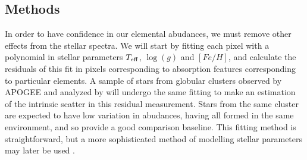 \documentclass[preprint]{aastex}
\begin{document}
\subsection{Methods}
\label{sec:methods}

In order to have confidence in our elemental abudances, we must remove other effects from the stellar spectra. We will start by fitting each pixel with a polynomial in stellar parameters $T_{\rm eff}$, $\log(g)$ and $[Fe/H]$, and calculate the residuals of this fit in pixels corresponding to absorption features corresponding to particular elements. A sample of stars from globular clusters observed by APOGEE and analyzed by \citet{meszaros2015} will undergo the same fitting to make an estimation of the intrinsic scatter in this residual measurement. Stars from the same cluster are expected to have low variation in abudances, having all formed in the same environment, and so provide a good comparison baseline. This fitting method is straightforward, but a more sophisticated method of modelling stellar parameters may later be used \citep{ness2015}.


\end{document}
